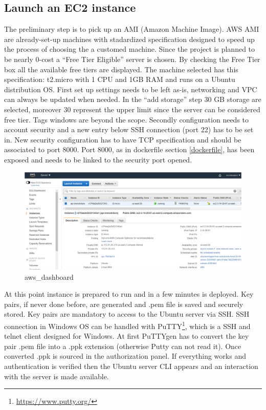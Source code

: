 \documentclass[
  12pt,
  a4paper,
  oneside]{book}
\DeclareRobustCommand{\href}[2]{#2\footnote{\url{#1}}}
\begin{document}
\hypertarget{launch-an-ec2-instance}{%
\subsection{Launch an EC2 instance}\label{launch-an-ec2-instance}}

The preliminary step is to pick up an AMI (Amazon Machine Image). AWS AMI are already-set-up machines with stadardized specification designed to speed up the process of choosing the a customed machine. Since the project is planned to be nearly 0-cost a ``Free Tier Eligible'' server is chosen. By checking the Free Tier box all the available free tiers are displayed. The machine selected has this specification: t2.micro with 1 CPU and 1GB RAM and runs on a Ubuntu distribution OS. First set up settings needs to be left as-is, networking and VPC can always be updated when needed. In the ``add storage'' step 30 GB storage are selected, moreover 30 represent the upper limit since the server can be considered free tier. Tags windows are beyond the scope. Secondly configuration needs to account security and a new entry below SSH connection (port 22) has to be set in. New security configuration has to have TCP specification and should be associated to port 8000. Port 8000, as in dockerfile section \ref{dockerfile}, has been exposed and needs to be linked to the security port opened.

\begin{figure}
\centering
\includegraphics{images/aws.PNG}
\caption{aws\_dashboard}
\end{figure}

At this point instance is prepared to run and in a few minutes is deployed. Key pairs, if never done before, are generated and .pem file is saved and securely stored. Key pairs are mandatory to access to the Ubuntu server via SSH. SSH connection in Windows OS can be handled with \href{https://www.putty.org/}{PuTTY}, which is a SSH and telnet client designed for Windows. At first PuTTYgen has to convert the key pair .pem file into a .ppk extension (otherwise Putty can not read it). Once converted .ppk is sourced in the authorization panel. If everything works and authentication is verified then the Ubuntu server CLI appears and an interaction with the server is made available.
\end{document}
